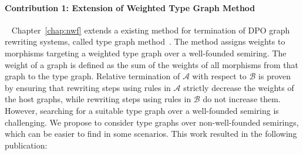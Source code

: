  

\paragraph{Contribution 1: Extension of Weighted Type Graph Method}\ \newline
Chapter~\ref{chap:nwf} extends a existing method for termination of DPO graph rewriting systems, called type graph method~\cite{zantema2014termination,bruggink2014termination,bruggink2015proving,endrullis2024generalized_icgt}. 
The method assigns weights to morphisms targeting a weighted type graph over a well-founded semiring. The weight of a graph is defined
 as the sum of the weights of all morphisms from that graph to the type graph. Relative termination of $\mathcal{A}$ with respect to $\mathcal{B}$ is proven by ensuring that rewriting steps using rules in \( \mathcal{A} \) strictly decrease the weights of the host graphs, while rewriting steps using rules in \( \mathcal{B} \) do not increase them. However, searching for a suitable type graph over a well-founded semiring is challenging. We propose to consider type graphs over non-well-founded semirings, which can be easier to find in some scenarios. This work resulted in the following publication:
 
